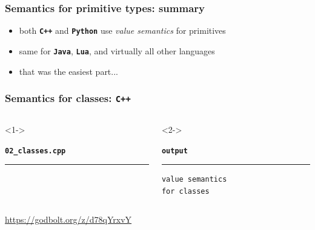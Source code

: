 \documentclass[aspectratio=169]{beamer}
\newcommand{\greenemph}[1]{\textit{\textcolor{clGreen}{#1}}}
\newcommand{\cpp}[1]{\texttt{\textbf{\textcolor{clCodeBlue}{#1}}}}
\begin{document}
\begin{frame}
\frametitle{Semantics for primitive types: summary}
\begin{itemize}
  \item{} both \cpp{C++} and \cpp{Python} use \greenemph{value semantics} for primitives
  \item{} same for \cpp{Java}, \cpp{Lua}, and virtually all other languages
  \item{} that was the easiest part...
\end{itemize}
\end{frame}

\begin{frame}[fragile]
\frametitle{Semantics for classes: \cpp{C++}}
\begin{columns}[T]
  \begin{column}{0.7\textwidth}<1->
    {\color[HTML]{cb4b16}
    \texttt{\textbf{02\_classes.cpp}}\vspace{-9pt}
    \rule{\linewidth}{2pt}}%
    {\fontsize{8}{6} }%
    \vspace{-12pt}{\color[HTML]{cb4b16}\rule{\linewidth}{2pt}}%
  \end{column}
  \begin{column}{0.25\textwidth}<2->
    {\color[HTML]{002b36}
    \texttt{\textbf{output}}\vspace{-9pt}
    \rule{\linewidth}{2pt}}%
    {\fontsize{8}{6} \begin{lstlisting}[showstringspaces=false]
value semantics
for classes
    \end{lstlisting}
    }
    \vspace{-12pt}{\color[HTML]{002b36}\rule{\linewidth}{2pt}}%
  \end{column}
\end{columns}
\pause{}
\begin{center}\url{https://godbolt.org/z/d78qYrxvY}\end{center}
\end{frame}
\end{document}
